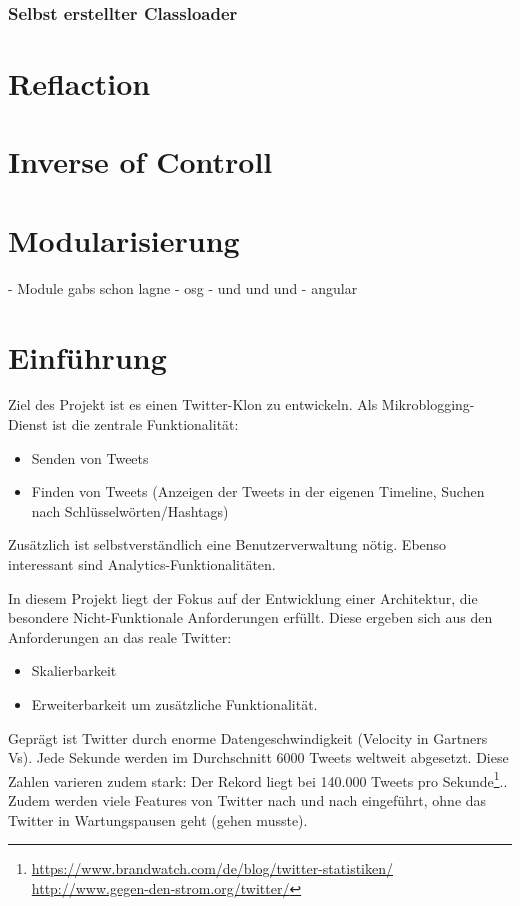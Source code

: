\subsubsection{Selbst erstellter Classloader}



\section{Reflaction} 
\label{sec:reflaction}




\section{Inverse of Controll}
\label{sec:inverse_of_controll}



\section{Modularisierung}
\label{sec:modularisierung}
- Module gabs schon lagne 
- osg 
- und und und 
- angular 


\section{Einführung}
Ziel des Projekt ist es einen Twitter-Klon zu entwickeln. Als Mikroblogging-Dienst ist die zentrale Funktionalität:
\begin{itemize}
  \item Senden von Tweets
  \item Finden von Tweets (Anzeigen der Tweets in der eigenen Timeline, Suchen nach Schlüsselwörten/Hashtags)
\end{itemize}
Zusätzlich ist selbstverständlich eine Benutzerverwaltung nötig. Ebenso interessant sind Analytics-Funktionalitäten.

In diesem Projekt liegt der Fokus auf der Entwicklung  einer Architektur, die besondere Nicht-Funktionale Anforderungen
erfüllt. Diese ergeben sich aus den Anforderungen an das reale Twitter:
\begin{itemize}
  \item Skalierbarkeit
  \item Erweiterbarkeit um zusätzliche Funktionalität.
\end{itemize}

Geprägt ist Twitter durch enorme Datengeschwindigkeit (Velocity in Gartners Vs). Jede Sekunde werden im
Durchschnitt 6000 Tweets weltweit abgesetzt. Diese Zahlen varieren zudem
stark: Der Rekord liegt bei 140.000 Tweets pro Sekunde\footnote{\url{https://www.brandwatch.com/de/blog/twitter-statistiken/}
\url{http://www.gegen-den-strom.org/twitter/}}.. Zudem werden viele Features von Twitter nach und nach eingeführt,
ohne das Twitter in Wartungspausen geht (gehen musste).

